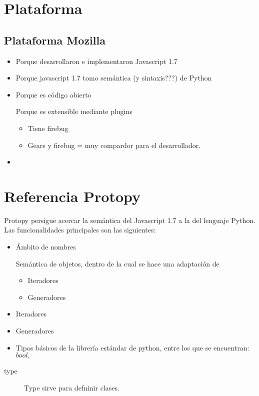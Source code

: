 \documentclass[a4paper]{report}
\begin{document}
\chapter{Plataforma}
\section{Plataforma Mozilla}
\begin{itemize}
  \item Porque desarrollaron e implementaron Javascript 1.7
  \item Porque javascript 1.7 tomo semántica (y sintaxis???) de Python
  \item Porque es código abierto
  \begin{item}
  	Porque es extensible mediante plugins
  	\begin{itemize}
        \item Tiene firebug
        \item Gears y firebug = muy compardor para el desarrollador.
     \end{itemize}
      
  \end{item}
  \item 
\end{itemize}



\chapter{Referencia Protopy}
\label{ch:protopy}

Protopy persigue acercar la semántica del Javascript 1.7 a la del lenguaje
Python. Las funcionalidades principales son las siguientes:
\begin{itemize}
  \item Ámbito de nombres
  \begin{item}
  Semántica de objetos, dentro de la cual se hace una adaptación de
  \begin{itemize}
  	\item Iteradores
  	\item Generadores  
  \end{itemize}
  \end{item}
  
  
  \item Iteradores
  \item Generadores
  
  \item Tipos básicos de la librería estándar de python, entre los que se
  encuentran: $ bool, $
\end{itemize}


\begin{description}
\item[type]{
Type sirve para defninir clases.
}
\end{description}
\begin{thebibliography}{99}


\end{thebibliography}
\end{document}
